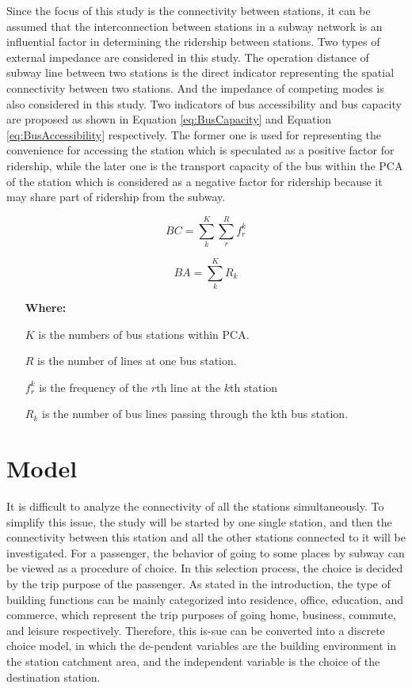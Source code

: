 \documentclass[utf8]{article}
\begin{document}
%
Since the focus of this study is the connectivity between stations, it can be assumed that the interconnection between stations in a subway network is an influential factor in determining the ridership between stations. Two types of external impedance are considered in this study. The operation distance of subway line between two stations is the direct indicator representing the spatial connectivity between two stations. And the impedance of competing modes is also considered in this study. Two indicators of bus accessibility and bus capacity are proposed as shown in Equation \ref{eq:BusCapacity} and Equation \ref{eq:BusAccessibility} respectively. The former one is used for representing the convenience for accessing the station which is speculated as a positive factor for ridership, while the later one is the transport capacity of the bus within the PCA of the station which is considered as a negative factor for ridership because it may share part of ridership from the subway.

\begin{equation}
	BC=\sum_{k}^{K}\sum_{r}^{R}f_{r}^{k}
	\label{eq:BusCapacity}
\end{equation}

\begin{equation}
BA=\sum_{k}^{K}R_{k}
\label{eq:BusAccessibility}
\end{equation}

\begin{enumerate}
	\item[\textbf{Where:}]
	\item[$K$] is the numbers of bus stations within PCA.
	\item[$R$] is the number of lines at one bus station.
	\item[$f_{r}^{k}$] is the frequency of the $r$th line at the $k$th station
	\item[$R_k$] is the number of bus lines passing through the kth bus station.
\end{enumerate}

\section{Model}
\indent

%
It is difficult to analyze the connectivity of all the stations simultaneously. To simplify this issue, the study will be started by one single station, and then the connectivity between this station and all the other stations connected to it will be investigated. For a passenger, the behavior of going to some places by subway can be viewed as a procedure of choice. In this selection process, the choice is decided by the trip purpose of the passenger. As stated in the introduction, the type of building functions can be mainly categorized into residence, office, education, and commerce, which represent the trip purposes of going home, business, commute, and leisure respectively. Therefore, this is-sue can be converted into a discrete choice model, in which the de-pendent variables are the building environment in the station catchment area, and the independent variable is the choice of the destination station.
\end{document}
